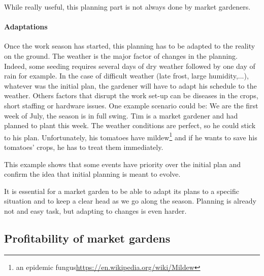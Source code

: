 While really useful, this planning part is not always done by market gardeners. 

\paragraph{Adaptations}
Once the work season has started, this planning has to be adapted to the reality on the ground.
The weather is the major factor of changes in the planning. Indeed, some seeding requires several days of dry weather followed by one day of rain for example. In the case of difficult weather (late frost, large humidity,...), whatever was the initial plan, the gardener will have to adapt his schedule to the weather.
Others factors that disrupt the work set-up can be diseases in the crops, short staffing or hardware issues.
One example scenario could be:
We are the first week of July, the season is in full swing. Tim is a market gardener and had planned to plant  this week. The weather conditions are perfect, so he could stick to his plan. Unfortunately, his tomatoes have mildew\footnote{an epidemic fungus\url{https://en.wikipedia.org/wiki/Mildew}} and if he wants to save his tomatoes' crops, he has to treat them immediately.

This example shows that some events have priority over the initial plan and confirm the idea that initial planning is meant to evolve.

It is essential for a market garden to be able to adapt its plans to a specific situation and to keep a clear head as we go along the season. Planning is already not and easy task, but adapting to changes is even harder. 



\subsection{Profitability of market gardens}
%
%
%



